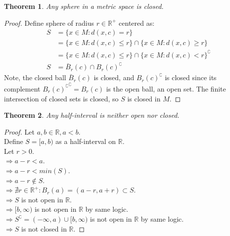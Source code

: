 \documentclass{article}
\newtheorem{theorem}{Theorem}[section]
\begin{document}
			\begin{theorem}
				Any sphere in a metric space is closed.
			\end{theorem}
			\begin{proof} 
				Define sphere of radius $r \in \mathbb{R}^+$ centered as:
				\begin{align*}
					S &= \{x \in M: d(x, c) = r \} \\
					  &= \{x \in M: d(x, c) \leq r \} \cap \{x \in M: d(x, c) \geq r \} \\
					  &= \{x \in M: d(x, c) \leq r \} \cap \{x \in M: d(x, c) < r \}^\complement \\
					S  &= \bar{B}_{r}(c)  \cap B_{r}(c)^\complement
				\end{align*}
				Note, the closed ball $\bar{B}_{r}(c)$ is closed, and $B_{r}(c)^{\complement}$ is closed since its complement ${B_{r}(c)^{\complement}}^{\complement} = B_{r}(c)$  is the open ball, an open set.
				The finite intersection of closed sets is closed, so $S$ is closed in $M$.
			\end{proof}
			\begin{theorem}
				Any half-interval is neither open nor closed.
			\end{theorem}
			\begin{proof} 
				Let $a, b \in \mathbb{R}, a < b$. \\
				Define $S = [a, b)$ as a half-interval on $\mathbb{R}$. \\
				Let $r > 0$. \\
				$\Rightarrow a - r < a$. \\
				$\Rightarrow a - r < min(S)$. \\
				$\Rightarrow a - r \notin S$. \\
				$\Rightarrow \nexists r \in \mathbb{R}^{+}: B_{r}(a) = (a - r, a + r) \subset S$. \\
				$\Rightarrow S$ is not open in $\mathbb{R}$. \\
				$\Rightarrow [b, \infty)$ is not open in $\mathbb{R}$ by same logic.\\
				$\Rightarrow S^\complement = (-\infty, a) \cup [b, \infty)$ is not open in $\mathbb{R}$ by same logic.\\
				$\Rightarrow S$ is not closed in $\mathbb{R}$.
			\end{proof}
\end{document}
